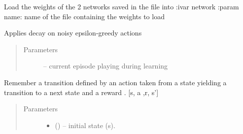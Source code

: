 \documentclass[letterpaper,10pt,english]{sphinxmanual}
\begin{document}
\begin{fulllineitems}
\begin{fulllineitems}
\begin{quote}
\begin{description}
\end{description}\end{quote}

\end{fulllineitems}


\begin{fulllineitems}
\label{\detokenize{package2:DDPG.DDPGAgent.load}}
Load the weights of the 2 networks saved in the file into :ivar network
:param name: name of the file containing the weights to load

\end{fulllineitems}


\begin{fulllineitems}
\label{\detokenize{package2:DDPG.DDPGAgent.noise_decay}}
Applies decay on noisy epsilon-greedy actions
\begin{quote}\begin{description}
\item[{Parameters}] \leavevmode
{} -- current episode playing during learning

\end{description}\end{quote}

\end{fulllineitems}


\begin{fulllineitems}
\label{\detokenize{package2:DDPG.DDPGAgent.remember}}
Remember a transition defined by an action  taken from a state  yielding a transition to a next
state  and a reward . {[}s, a ,r, s'{]}
\begin{quote}\begin{description}
\item[{Parameters}] \leavevmode\begin{itemize}
\item {} 
 () -- initial state (s).


\end{itemize}
\end{description}
\end{quote}
\end{fulllineitems}
\end{fulllineitems}
\end{document}
